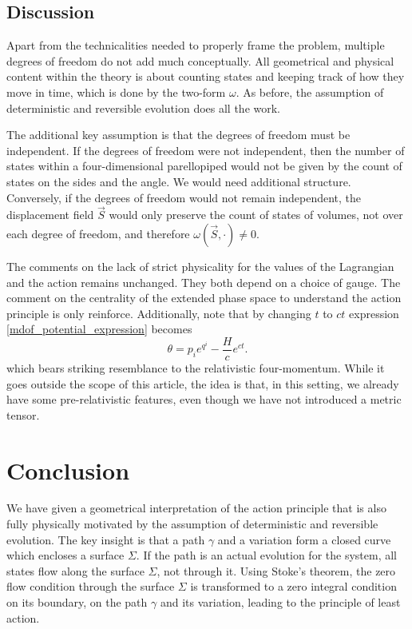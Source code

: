 \documentclass[10pt,twocolumn, nofootinbib]{revtex4-2}
\begin{document}
\subsection{Discussion}

Apart from the technicalities needed to properly frame the problem, multiple degrees of freedom do not add much conceptually. All geometrical and physical content within the theory is about counting states and keeping track of how they move in time, which is done by the two-form $\omega$. As before, the assumption of deterministic and reversible evolution does all the work.

The additional key assumption is that the degrees of freedom must be independent. If the degrees of freedom were not independent, then the number of states within a four-dimensional parellopiped would not be given by the count of states on the sides and the angle. We would need additional structure. Conversely, if the degrees of freedom would not remain independent, the displacement field $\vec{S}$ would only preserve the count of states of volumes, not over each degree of freedom, and therefore $\omega(\vec{S}, \cdot) \neq 0$.

The comments on the lack of strict physicality for the values of the Lagrangian and the action remains unchanged. They both depend on a choice of gauge. The comment on the centrality of the extended phase space to understand the action principle is only reinforce. Additionally, note that by changing $t$ to $ct$ expression \ref{mdof_potential_expression} becomes
\begin{equation}\label{mdof_potential_relativistic}
	\theta = p_i e^{q^i} - \frac{H}{c} e^{ct}.
\end{equation}
which bears striking resemblance to the relativistic four-momentum. While it goes outside the scope of this article, the idea is that, in this setting, we already have some pre-relativistic features, even though we have not introduced a metric tensor.

\section{Conclusion}

We have given a geometrical interpretation of the action principle that is also fully physically motivated by the assumption of deterministic and reversible evolution. The key insight is that a path $\gamma$ and a variation form a closed curve which encloses a surface $\Sigma$. If the path is an actual evolution for the system, all states flow along the surface $\Sigma$, not through it. Using Stoke's theorem, the zero flow condition through the surface $\Sigma$ is transformed to a zero integral condition on its boundary, on the path $\gamma$ and its variation, leading to the principle of least action.
\end{document}
